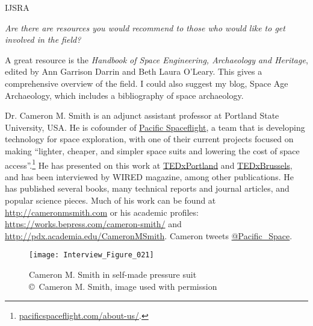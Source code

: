 \begin{labeling}{IJSRA}
	\item[IJSRA] \emph{Are there are resources you would recommend to those who would like to get involved in the field?}

	\item[AG] A great resource is the \emph{Handbook of Space Engineering, Archaeology and Heritage}, edited by Ann Garrison Darrin and Beth Laura O’Leary. This gives a comprehensive overview of the field. I could also suggest my blog, Space Age Archaeology, which includes a bibliography of space archaeology.

\end{labeling}

\IJSRAseparator


Dr. Cameron M. Smith is an adjunct assistant professor at Portland State University, USA. He is cofounder of \href{http://pacificspaceflight.com}{Pacific Spaceflight}, a team that is developing technology for space exploration, with one of their current projects focused on making “lighter, cheaper, and simpler space suits and lowering the cost of space access”.\footnote{\url{pacificspaceflight.com/about-us/}.} He has presented on this work at \href{https://www.youtube.com/watch?v=C17yk-xsZpA}{TEDxPortland} and \href{https://www.youtube.com/watch?v=bMlL0aV75VY}{TEDxBrussels}, and has been interviewed by WIRED magazine, among other publications. He has published several books, many technical reports and journal articles, and popular science pieces. Much of his work can be found at \href{http://cameronmsmith.com}{http://cameronmsmith.com} or his academic profiles: \href{https://works.bepress.com/cameron-smith/}{https://works.bepress.com/cameron-smith/} and \href{http://pdx.academia.edu/CameronMSmith}{http://pdx.academia.edu/CameronMSmith}. Cameron tweets \href{<twitter.com/pacific_space>}{@Pacific\_Space}.

\begin{figure}[!tb]
	\texttt{[image: Interview\_Figure\_021]}
	\centering
	\caption{Cameron M. Smith in self-made pressure suit
		{\normalfont\scriptsize \\ \copyright\ Cameron M. Smith, image used with permission
	}}
	\label{Interview_Figure_021}
\end{figure}

